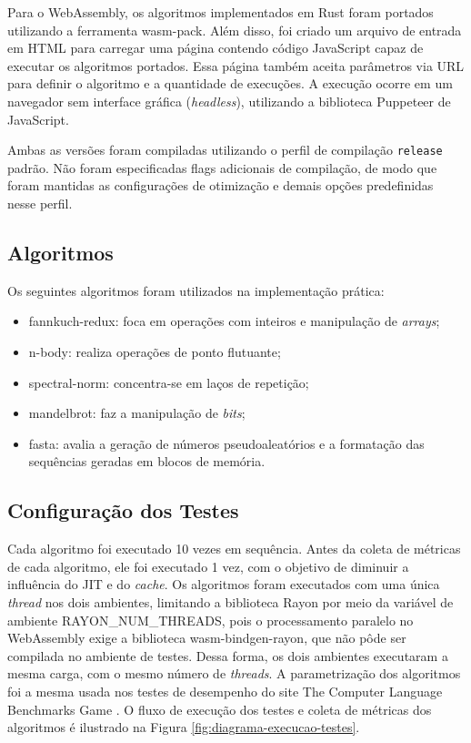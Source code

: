 Para o WebAssembly, os algoritmos implementados em Rust foram portados utilizando a ferramenta wasm-pack. Além disso, foi criado um arquivo de entrada em HTML para carregar uma página contendo código JavaScript capaz de executar os algoritmos portados. Essa página também aceita parâmetros via URL para definir o algoritmo e a quantidade de execuções. A execução ocorre em um navegador sem interface gráfica (\emph{headless}), utilizando a biblioteca Puppeteer de JavaScript.

Ambas as versões foram compiladas utilizando o perfil de compilação \texttt{release} padrão. Não foram especificadas flags adicionais de compilação, de modo que foram mantidas as configurações de otimização e demais opções predefinidas nesse perfil.

\subsection{Algoritmos}

Os seguintes algoritmos foram utilizados na implementação prática:

\begin{itemize}
    \item fannkuch-redux: foca em operações com inteiros e manipulação de \emph{arrays};
    \item n-body: realiza operações de ponto flutuante;
    \item spectral-norm: concentra-se em laços de repetição;
    \item mandelbrot: faz a manipulação de \emph{bits};
    \item fasta: avalia a geração de números pseudoaleatórios e a formatação das sequências geradas em blocos de memória.
\end{itemize}

\subsection{Configuração dos Testes}

Cada algoritmo foi executado 10 vezes em sequência. Antes da coleta de métricas de cada algoritmo, ele foi executado 1 vez, com o objetivo de diminuir a influência do JIT e do \emph{cache}. Os algoritmos foram executados com uma única \emph{thread} nos dois ambientes, limitando a biblioteca Rayon por meio da variável de ambiente RAYON\_NUM\_THREADS, pois o processamento paralelo no WebAssembly exige a biblioteca wasm-bindgen-rayon, que não pôde ser compilada no ambiente de testes. Dessa forma, os dois ambientes executaram a mesma carga, com o mesmo número de \emph{threads}. A parametrização dos algoritmos foi a mesma usada nos testes de desempenho do site The Computer Language Benchmarks Game \cite{bench2026}. O fluxo de execução dos testes e coleta de métricas dos algoritmos é ilustrado na Figura \ref{fig:diagrama-execucao-testes}.

